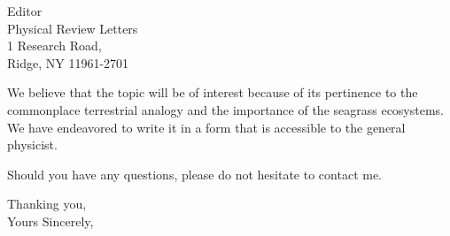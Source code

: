 \documentclass[10pt]{letter}
\begin{document}
\begin{letter}{
Editor \\
Physical Review Letters \\
1 Research Road, \\
Ridge, NY 11961-2701 
}
%

We believe that the topic will be of interest because of its pertinence to the commonplace terrestrial analogy and the importance of the seagrass ecosystems. We have endeavored to write it in a form that is accessible to the general physicist. 

Should you have any questions, please do not hesitate to contact me.

\closing{Thanking you, \\Yours Sincerely,}

\end{letter}
\end{document}
